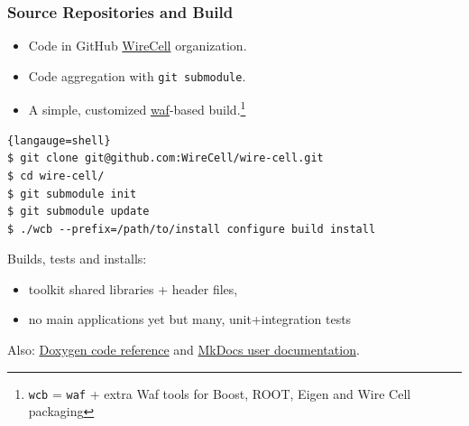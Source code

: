 \begin{frame}[fragile]
  \frametitle{Source Repositories and Build}

  \begin{itemize}
  \item Code in GitHub \href{https://github.com/WireCell/}{WireCell} organization.
  \item Code aggregation with \texttt{git submodule}.
  \item A simple, customized \href{https://waf.io/}{waf}-based build.\footnote{\texttt{wcb} = \texttt{waf} + extra Waf tools for Boost, ROOT, Eigen and Wire Cell packaging}
  

  \end{itemize}

  \begin{lstlisting}{langauge=shell}
$ git clone git@github.com:WireCell/wire-cell.git
$ cd wire-cell/
$ git submodule init
$ git submodule update
$ ./wcb --prefix=/path/to/install configure build install
  \end{lstlisting}

  Builds, tests and installs:
  \begin{itemize}
  \item toolkit shared libraries + header files,
  \item no main applications yet but many, unit+integration tests
  \end{itemize}
  Also: \href{http://www.phy.bnl.gov/wire-cell/doxy/html/}{Doxygen code reference} and \href{http://wirecell.github.io/wire-cell-docs/}{MkDocs user documentation}.


\end{frame}

